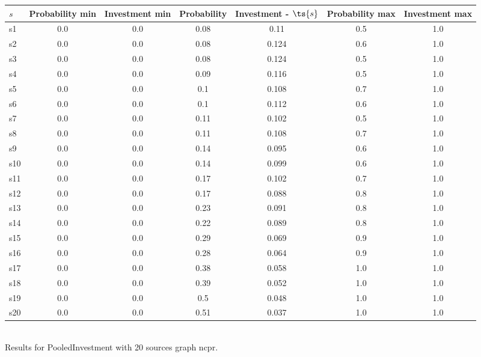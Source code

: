 \documentclass{article}
\begin{document}
\noindent\begin{tabular}{|l|c|c|c|c|c|c|}
\hline
$s$& Probability min & Investment min & Probability & Investment - $\ts{s}$ & Probability max & Investment max\\
\hline
s1 &0.0 & 0.0 & 0.08 & 0.11 & 0.5 & 1.0\\
\hline
s2 &0.0 & 0.0 & 0.08 & 0.124 & 0.6 & 1.0\\
\hline
s3 &0.0 & 0.0 & 0.08 & 0.124 & 0.5 & 1.0\\
\hline
s4 &0.0 & 0.0 & 0.09 & 0.116 & 0.5 & 1.0\\
\hline
s5 &0.0 & 0.0 & 0.1 & 0.108 & 0.7 & 1.0\\
\hline
s6 &0.0 & 0.0 & 0.1 & 0.112 & 0.6 & 1.0\\
\hline
s7 &0.0 & 0.0 & 0.11 & 0.102 & 0.5 & 1.0\\
\hline
s8 &0.0 & 0.0 & 0.11 & 0.108 & 0.7 & 1.0\\
\hline
s9 &0.0 & 0.0 & 0.14 & 0.095 & 0.6 & 1.0\\
\hline
s10 &0.0 & 0.0 & 0.14 & 0.099 & 0.6 & 1.0\\
\hline
s11 &0.0 & 0.0 & 0.17 & 0.102 & 0.7 & 1.0\\
\hline
s12 &0.0 & 0.0 & 0.17 & 0.088 & 0.8 & 1.0\\
\hline
s13 &0.0 & 0.0 & 0.23 & 0.091 & 0.8 & 1.0\\
\hline
s14 &0.0 & 0.0 & 0.22 & 0.089 & 0.8 & 1.0\\
\hline
s15 &0.0 & 0.0 & 0.29 & 0.069 & 0.9 & 1.0\\
\hline
s16 &0.0 & 0.0 & 0.28 & 0.064 & 0.9 & 1.0\\
\hline
s17 &0.0 & 0.0 & 0.38 & 0.058 & 1.0 & 1.0\\
\hline
s18 &0.0 & 0.0 & 0.39 & 0.052 & 1.0 & 1.0\\
\hline
s19 &0.0 & 0.0 & 0.5 & 0.048 & 1.0 & 1.0\\
\hline
s20 &0.0 & 0.0 & 0.51 & 0.037 & 1.0 & 1.0\\
\hline
\end{tabular}\\

\noindent Results for PooledInvestment with 20 sources graph ncpr.
\end{document}
